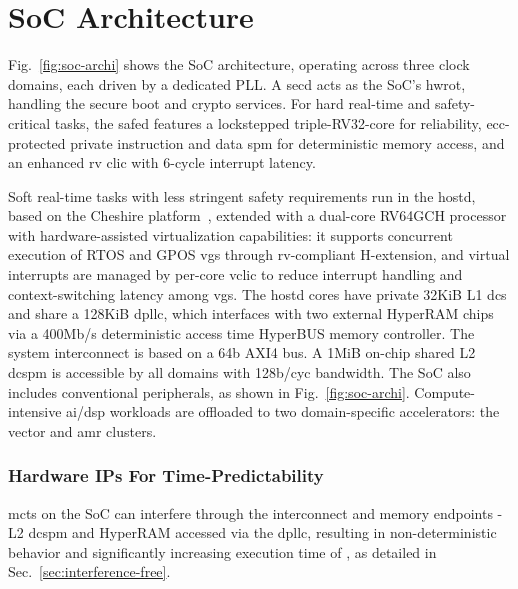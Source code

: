\section{SoC Architecture}
Fig.~\ref{fig:soc-archi} shows the SoC architecture, operating across three clock domains, each driven by a dedicated PLL. A \gls{secd} acts as the SoC’s \gls{hwrot}, handling the secure boot and crypto services. 
For hard real-time and safety-critical tasks, the \gls{safed} features a lockstepped triple-RV32-core for reliability, \gls{ecc}-protected private instruction and data \gls{spm} for deterministic memory access, and an enhanced \gls{rv} \gls{clic} with 6-cycle interrupt latency.


Soft real-time tasks with less stringent safety requirements run in the \gls{hostd}, based on the Cheshire platform~\cite{ottavianoCheshireLightweightLinuxCapable2023}, extended with a dual-core RV64GCH processor with hardware-assisted virtualization capabilities: it supports concurrent execution of RTOS and GPOS \glspl{vg} through \gls{rv}-compliant H-extension, and virtual interrupts are managed by per-core \gls{vclic} to reduce interrupt handling and context-switching latency among \glspl{vg}. 
%
The \gls{hostd} cores have private 32KiB L1 \glspl{dc} and share a 128KiB \gls{dpllc}, which interfaces with two external HyperRAM chips via a 400Mb/s deterministic access time HyperBUS memory controller. 
%
The system interconnect is based on a 64b AXI4 bus. A 1MiB on-chip shared L2 \gls{dcspm} is accessible by all domains with 128b/cyc bandwidth. The SoC also includes conventional peripherals, as shown in Fig.~\ref{fig:soc-archi}. Compute-intensive \gls{ai}/\gls{dsp} workloads are offloaded to two domain-specific accelerators: the vector and \gls{amr} clusters. %

\subsubsection{Hardware IPs For Time-Predictability}

\glspl{mct} on the SoC can interfere through the interconnect and memory endpoints - L2 \gls{dcspm} and HyperRAM accessed via the \gls{dpllc}, resulting in non-deterministic behavior and significantly increasing execution time of , as detailed in  Sec.~\ref{sec:interference-free}.

